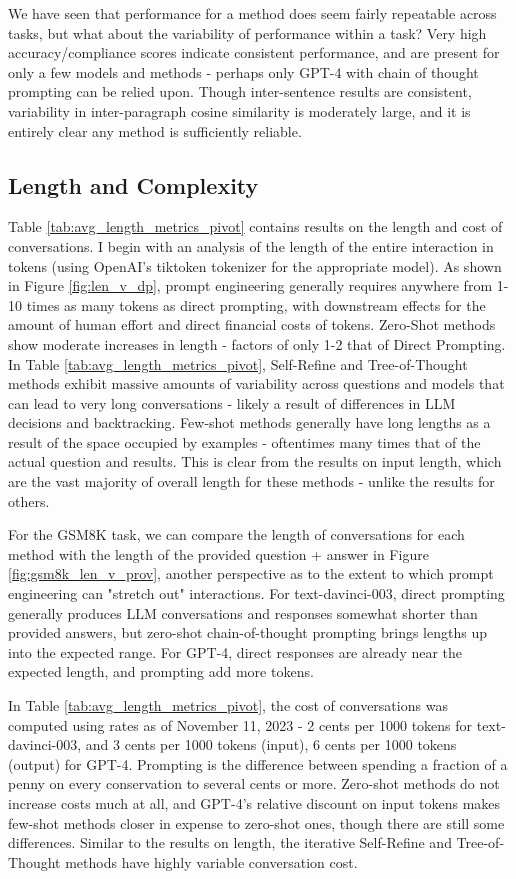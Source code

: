\documentclass[11pt]{article}
\begin{document}
We have seen that performance for a method does seem fairly repeatable across tasks, but what about the variability of performance within a task? Very high accuracy/compliance scores indicate consistent performance, and are present for only a few models and methods - perhaps only GPT-4 with chain of thought prompting can be relied upon. Though inter-sentence results are consistent, variability in inter-paragraph cosine similarity is moderately large, and it is entirely clear any method is sufficiently reliable.

\subsection*{Length and Complexity}

Table \ref{tab:avg_length_metrics_pivot} contains results on the length and cost of conversations. I begin with an analysis of the length of the entire interaction in tokens (using OpenAI's tiktoken tokenizer for the appropriate model). As shown in Figure \ref{fig:len_v_dp}, prompt engineering generally requires anywhere from 1-10 times as many tokens as direct prompting, with downstream effects for the amount of human effort and direct financial costs of tokens. Zero-Shot methods show moderate increases in length - factors of only 1-2 that of Direct Prompting. In Table \ref{tab:avg_length_metrics_pivot}, Self-Refine and Tree-of-Thought methods exhibit massive amounts of variability across questions and models that can lead to very long conversations - likely a result of differences in LLM decisions and backtracking. Few-shot methods generally have long lengths as a result of the space occupied by examples - oftentimes many times that of the actual question and results. This is clear from the results on input length, which are the vast majority of overall length for these methods - unlike the results for others.

For the GSM8K task, we can compare the length of conversations for each method with the length of the provided question + answer in Figure \ref{fig:gsm8k_len_v_prov}, another perspective as to the extent to which prompt engineering can "stretch out" interactions. For text-davinci-003, direct prompting generally produces LLM conversations and responses somewhat shorter than provided answers, but zero-shot chain-of-thought prompting brings lengths up into the expected range. For GPT-4, direct responses are already near the expected length, and prompting add more tokens.

In Table \ref{tab:avg_length_metrics_pivot}, the cost of conversations was computed using rates as of November 11, 2023 - 2 cents per 1000 tokens for text-davinci-003, and 3 cents per 1000 tokens (input), 6 cents per 1000 tokens (output) for GPT-4. Prompting is the difference between spending a fraction of a penny on every conservation to several cents or more. Zero-shot methods do not increase costs much at all, and GPT-4's relative discount on input tokens makes few-shot methods closer in expense to zero-shot ones, though there are still some differences. Similar to the results on length, the iterative Self-Refine and Tree-of-Thought methods have highly variable conversation cost.
\end{document}
